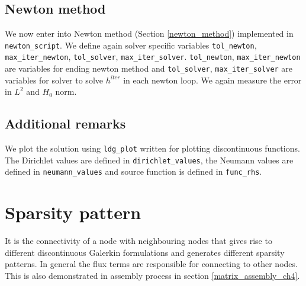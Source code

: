 \documentclass[a4paper]{book}
\begin{document}
\subsection{Newton method}

We now enter into Newton method (Section \ref{newton_method}) implemented in \verb|newton_script|. We define again solver specific variables \verb|tol_newton|, \verb|max_iter_newton|, \verb|tol_solver|, \verb|max_iter_solver|. \verb|tol_newton|, \verb|max_iter_newton| are variables for ending newton method and \verb|tol_solver|, \verb|max_iter_solver| are variables for solver to solve $h^{iter}$ in each newton loop. We again measure the error in $L^2$ and $H_0$ norm.\\

\subsection{Additional remarks}

We plot the solution using  \verb|ldg_plot| written for plotting discontinuous functions. The Dirichlet values are defined in \verb|dirichlet_values|, the Neumann values are defined in \verb|neumann_values| and source function is defined in \verb|func_rhs|. 

\section{Sparsity pattern}

It is the connectivity of a node with neighbouring nodes that gives rise to different discontinuous Galerkin formulations and generates different sparsity patterns. In general the flux terms are responsible for connecting to other nodes. This is also demonstrated in assembly process in section \ref{matrix_assembly_ch4}. \\
\end{document}
